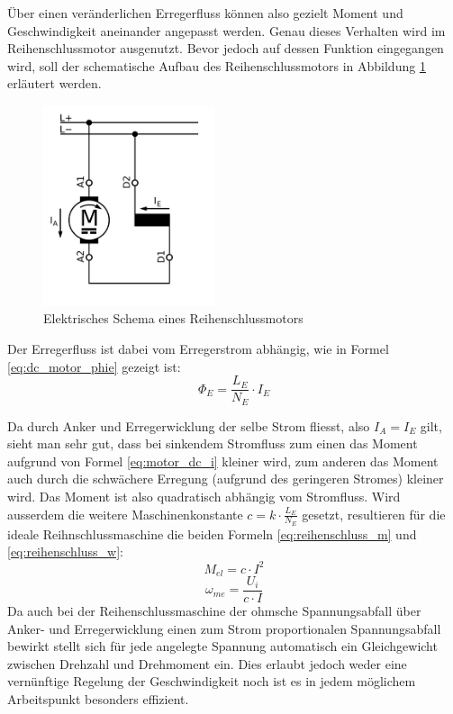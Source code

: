 Über einen veränderlichen Erregerfluss können also gezielt Moment und Geschwindigkeit aneinander angepasst werden. Genau dieses Verhalten wird im Reihenschlussmotor ausgenutzt. Bevor jedoch auf dessen Funktion eingegangen wird, soll der schematische Aufbau des Reihenschlussmotors in Abbildung \ref{fig:reihenschluss} erläutert werden.

\begin{figure}[h!]
	\centering
		\includegraphics[width=0.45\textwidth]{images/Reihenschlussmotor.png}
	\caption{Elektrisches Schema eines Reihenschlussmotors \cite{wiki_reihenschlussmotor}}
	\label{fig:reihenschluss}
\end{figure}

Der Erregerfluss ist dabei vom Erregerstrom abhängig, wie in Formel \ref{eq:dc_motor_phie} gezeigt ist:
\begin{equation}
	\Phi_E=\frac{L_E}{N_E}\cdot I_E
\label{eq:dc_motor_phie}
\end{equation}\newpage

Da durch Anker und Erregerwicklung der selbe Strom fliesst, also $I_A=I_E$ gilt, sieht man sehr gut, dass bei sinkendem Stromfluss zum einen das Moment aufgrund von Formel \ref{eq:motor_dc_i} kleiner wird, zum anderen das Moment auch durch die schwächere Erregung (aufgrund des geringeren Stromes) kleiner wird. Das Moment ist also quadratisch abhängig vom Stromfluss. Wird ausserdem die weitere Maschinenkonstante $c=k\cdot\frac{L_E}{N_E}$ gesetzt, resultieren für die ideale Reihnschlussmaschine die beiden Formeln \ref{eq:reihenschluss_m} und \ref{eq:reihenschluss_w}:
\begin{equation}
	M_{el}=c\cdot I^2
\label{eq:reihenschluss_m}
\end{equation}
\begin{equation}
	\omega_{me}=\frac{U_i}{c\cdot I}
\label{eq:reihenschluss_w}
\end{equation}
Da auch bei der Reihenschlussmaschine der ohmsche Spannungsabfall über Anker- und Erregerwicklung einen zum Strom proportionalen Spannungsabfall bewirkt stellt sich für jede angelegte Spannung automatisch ein Gleichgewicht zwischen Drehzahl und Drehmoment ein. Dies erlaubt jedoch weder eine vernünftige Regelung der Geschwindigkeit noch ist es in jedem möglichem Arbeitspunkt besonders effizient.

